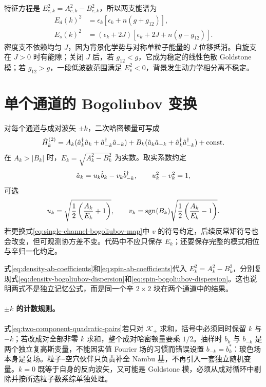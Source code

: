 特征方程是 $E_{c,k}^2=A_{c,k}^2-B_{c,k}^2$，所以两支能谱为
\begin{align}
  E_d(k)^2&=\epsilon_k\left[\epsilon_k+n(g+g_{12})\right],
  \label{eq:density-bogoliubov-dispersion}\\
  E_s(k)^2&=(\epsilon_k+2J)
  \left[\epsilon_k+2J+n(g-g_{12})\right].
  \label{eq:spin-bogoliubov-dispersion}
\end{align}
密度支不依赖均匀 $J$，因为背景化学势与对称单粒子能量的 $J$ 位移抵消。自旋支在 $J>0$ 时有能隙；关闭 $J$ 后，若 $g_{12}<g$，它成为稳定的线性色散 Goldstone 模；若 $g_{12}>g$，一段低波数范围满足 $E_s^2<0$，背景发生动力学相分离不稳定。

\section{单个通道的 Bogoliubov 变换}

对每个通道与成对波矢 $\pm k$，二次哈密顿量可写成
\begin{equation}
  \hat H_k^{(2)}=
  A_k(\hat a^{\dagger}_k\hat a_k+\hat a^{\dagger}_{-k}\hat a_{-k})
  +B_k(\hat a_k\hat a_{-k}+\hat a^{\dagger}_k\hat a^{\dagger}_{-k})+{\rm const.}
  \label{eq:paired-bogoliubov-hamiltonian}
\end{equation}
在 $A_k>|B_k|$ 时，$E_k=\sqrt{A_k^2-B_k^2}$ 为实数。取实系数约定
\begin{equation}
  \hat a_k=u_k\hat b_k-v_k\hat b^{\dagger}_{-k},
  \qquad
  u_k^2-v_k^2=1,
  \label{eq:single-channel-bogoliubov-map}
\end{equation}
可选
\begin{equation}
  u_k=\sqrt{\frac12\left(\frac{A_k}{E_k}+1\right)},
  \qquad
  v_k={\rm sgn}(B_k)
  \sqrt{\frac12\left(\frac{A_k}{E_k}-1\right)}.
  \label{eq:bogoliubov-uv}
\end{equation}
若更换式\eqref{eq:single-channel-bogoliubov-map}中 $v$ 的符号约定，后续反常矩符号也会改变，但可观测协方差不变。代码中不应只保存 $E_k$；还要保存完整的模式相位与辛归一化约定。

式\eqref{eq:density-ab-coefficients}和\eqref{eq:spin-ab-coefficients}代入 $E_k^2=A_k^2-B_k^2$，分别复现式\eqref{eq:density-bogoliubov-dispersion}和\eqref{eq:spin-bogoliubov-dispersion}。这也说明两式不是独立记忆公式，而是同一个辛 $2\times2$ 块在两个通道中的结果。

\paragraph{$\pm k$ 的计数规则。}
式\eqref{eq:two-component-quadratic-pairs}若只对 $\mathcal K_+$ 求和，括号中必须同时保留 $k$ 与 $-k$；若改成对全部非零 $k$ 求和，整个成对哈密顿量要乘 $1/2$。抽样时 $b_k$ 与 $b_{-k}$ 是两个独立复高斯变量，不能因实值 Fourier 场的习惯而错误设置 $b_{-k}=b_k^*$：玻色场本身是复场。粒子--空穴伙伴只负责补全 Nambu 基，不再引入一套独立随机变量。$k=0$ 既等于自身的反向波矢，又可能是 Goldstone 模，必须从成对循环中剔除并按所选粒子数系综单独处理。

